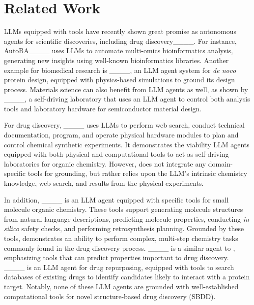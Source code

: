 \section{Related Work}

LLMs equipped with tools
have recently shown great promise as autonomous agents for scientific discoveries, including
drug discovery____.
%
For instance, AutoBA____ uses LLMs
to automate multi-omics bioinformatics analysis,
generating new insights using well-known bioinformatics 
libraries.
%
Another example for biomedical research is \protagent____, an LLM agent system for \emph{de novo} protein design, equipped with physics-based simulations to ground its design process.
%
Materials science can also benefit from LLM agents as well, as shown by
\alab____, a self-driving laboratory that uses an LLM agent to control both analysis tools and laboratory hardware for semiconductor material design.

%
For drug discovery, 
\coscientist____ uses LLMs to perform web search,
conduct technical documentation, program, and operate physical hardware modules
to plan and control chemical synthetic experiments.
%
It demonstrates the viability LLM agents equipped with both physical and computational tools to 
act as self-driving laboratories for organic chemistry. 
%
However, \coscientist does not integrate any domain-specific tools for grounding, but rather relies upon the LLM's intrinsic chemistry knowledge, web search, and results from the physical experiments.

In addition, \chemcrow____ is an LLM agent equipped with specific tools for small molecule organic chemistry.
These tools support generating molecule structures from natural language descriptions, predicting molecule properties,
conducting \emph{in silico} safety checks, and performing retrosynthesis planning.
Grounded by these tools, \chemcrow demonstrates an ability to perform complex, multi-step chemistry tasks commonly found in the drug discovery process. 
%
\cactus____ is a similar agent to \chemcrow,
emphasizing tools that can predict properties important to drug discovery.
%
\drugagent____ is an LLM agent for drug repurposing, equipped with tools to search databases of existing drugs to identify candidates likely to interact with a protein target.
%
Notably, none of these LLM agents are grounded with well-established computational tools for 
novel structure-based drug discovery (SBDD).  

